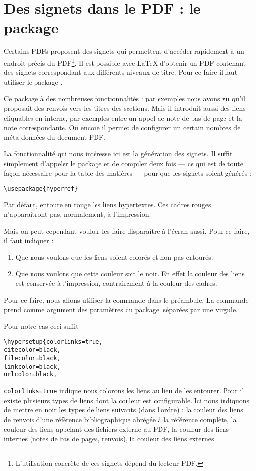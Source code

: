 \section{Des signets dans le PDF : le package }\label{hyperref}

Certains PDFs proposent des signets qui permettent d'accéder rapidement à un endroit précis du PDF\footnote{L'utilisation concrète de ces signets dépend du lecteur PDF.}. Il est possible avec \LaTeX{} d'obtenir un PDF contenant des signets correspondant aux différents niveaux de titre. Pour ce faire il faut utiliser le package .

Ce package à des nombreuses fonctionnalités : par exemples nous avons vu qu'il proposait des renvois vers les titres des sections.
Mais il introduit aussi des liens cliquables en interne, par exemples entre un appel de note de bas de page et la note correspondante. Ou encore il permet de configurer un certain nombres de méta-données du document PDF.

La fonctionnalité qui nous intéresse ici est la génération des signets. Il suffit simplement d'appeler le package et de compiler deux fois --- ce qui est de toute façon nécessaire pour la table des matières --- pour que les signets soient générés :

\begin{verbatim}
\usepackage{hyperref}
\end{verbatim}

Par défaut,  entoure en rouge les liens hypertextes. Ces cadres rouges n'apparaîtront pas, normalement, à l'impression.

Mais on peut cependant vouloir les faire disparaître à l'écran aussi. Pour ce faire, il faut indiquer :
\begin{enumerate}
\item Que nous voulons que les liens soient colorés et non pas entourés.
\item Que nous voulons que cette couleur soit le noir. En effet la couleur des liens est conservée à l'impression, contrairement à la couleur des cadres.
\end{enumerate}

Pour ce faire, nous allons utiliser la commande  dans le préambule. La commande prend comme argument des paramètres du package, séparées par une virgule.

Pour notre cas ceci suffit
\begin{verbatim}
\hypersetup{colorlinks=true,
citecolor=black,
filecolor=black,
linkcolor=black,
urlcolor=black,
\end{verbatim}

\verb|colorlinks=true| indique nous colorons les liens au lieu de les entourer. Pour  il existe plusieurs types de liens dont la couleur est configurable. Ici nous indiquons de mettre en noir les types de liens suivants (dans l'ordre) : la couleur des liens de renvois d'une référence bibliographique abrégée à la référence complète, la couleur des liens appelant des fichiers externe au PDF, la couleur des liens internes (notes de bas de pages, renvois), la couleur des liens externes.